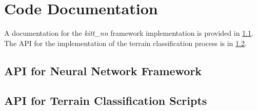 \chapter{Code Documentation} \label{app:code_documentation}
A documentation for the \textit{kitt\_nn} framework implementation is provided in \cref{app:sec:api_kitt_nn}. The API for the implementation of the terrain classification process is in \cref{app:sec:api_scripts}.

\section{API for Neural Network Framework} \label{app:sec:api_kitt_nn}

\section{API for Terrain Classification Scripts} \label{app:sec:api_scripts}
\noindent{}
\\
